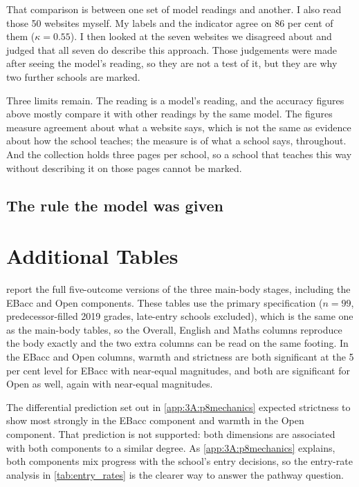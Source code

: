 That comparison is between one set of model readings and another. I also read
those 50 websites myself. My labels and the indicator agree on 86 per cent of
them ($\kappa = 0.55$). I then looked at the seven websites we disagreed about
and judged that all seven do describe this approach. Those judgements were
made after seeing the model's reading, so they are not a test of it, but they
are why two further schools are marked.

Three limits remain. The reading is a model's reading, and the accuracy
figures above mostly compare it with other readings by the same model. The
figures measure agreement about what a website says, which is not the same as
evidence about how the school teaches; the measure is of what a school says,
throughout. And the collection holds three pages per school, so a school that
teaches this way without describing it on those pages cannot be marked.

\subsection{The rule the model was given}
\label{app:3A:pedrule}



\section{Additional Tables}
\label{app:3A:tables}

 report the
full five-outcome versions of the three main-body stages, including the EBacc
and Open components. These tables use the primary specification ($n = 99$,
predecessor-filled 2019 grades, late-entry schools excluded), which is
the same one as the main-body tables, so the Overall, English and Maths
columns reproduce the body exactly and the two extra columns can be read on
the same footing.
In the EBacc and Open columns, warmth and strictness are both significant
at the 5 per cent level for EBacc with near-equal magnitudes, and both are
significant for Open as well, again with near-equal magnitudes.

The differential prediction set out in \cref{app:3A:p8mechanics} expected
strictness to show most strongly in the EBacc component and warmth in the
Open component. That prediction is not supported: both dimensions are
associated with both components to a similar degree. As \cref{app:3A:p8mechanics} explains, both components mix progress with
the school's entry decisions, so the entry-rate analysis in
\cref{tab:entry_rates} is the clearer way to answer the pathway question.

